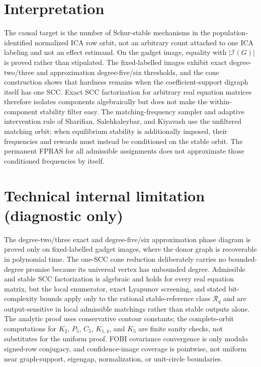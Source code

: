 \documentclass{article}
\begin{document}
\section{Interpretation}

The causal target is the number of Schur-stable mechanisms in the population-identified normalized ICA row orbit, not an arbitrary count attached to one ICA labeling and not an effect estimand. On the gadget image, equality with \(|\mathcal I(G)|\) is proved rather than stipulated. The fixed-labelled images exhibit exact degree-two/three and approximation degree-five/six thresholds, and the cone construction shows that hardness remains when the coefficient-support digraph itself has one SCC. Exact SCC factorization for arbitrary real equation matrices therefore isolates components algebraically but does not make the within-component stability filter easy. The matching-frequency sampler and adaptive intervention rule of Sharifian, Salehkaleybar, and Kiyavash use the unfiltered matching orbit; when equilibrium stability is additionally imposed, their frequencies and rewards must instead be conditioned on the stable orbit. The permanent FPRAS for all admissible assignments does not approximate those conditioned frequencies by itself.

\section*{Technical internal limitation (diagnostic only)}

The degree-two/three exact and degree-five/six approximation phase diagram is proved only on fixed-labelled gadget images, where the donor graph is recoverable in polynomial time. The one-SCC cone reduction deliberately carries no bounded-degree promise because its universal vertex has unbounded degree. Admissible and stable SCC factorization is algebraic and holds for every real equation matrix, but the local enumerator, exact Lyapunov screening, and stated bit-complexity bounds apply only to the rational stable-reference class \(\mathcal R_q\) and are output-sensitive in local admissible matchings rather than stable outputs alone. The analytic proof uses conservative contour constants; the complete-orbit computations for \(K_2\), \(P_5\), \(C_5\), \(K_{1,4}\), and \(K_5\) are finite sanity checks, not substitutes for the uniform proof. FOBI covariance convergence is only modulo signed-row conjugacy, and confidence-image coverage is pointwise, not uniform near graph-support, eigengap, normalization, or unit-circle boundaries.
\end{document}
